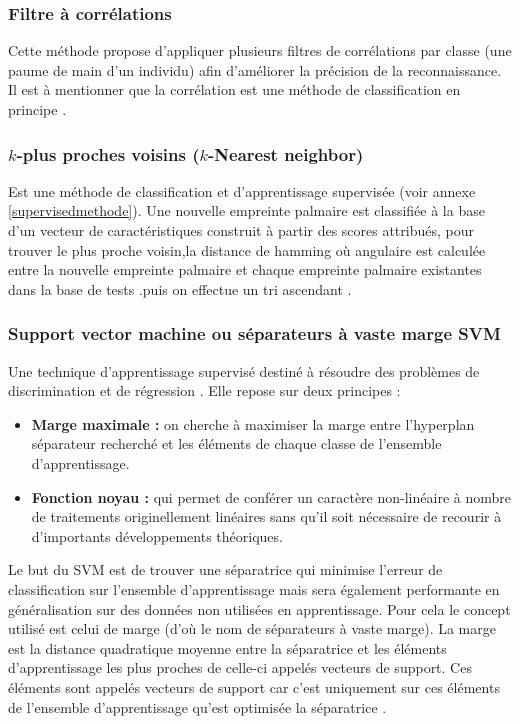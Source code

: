 \subsubsection{Filtre à corrélations }
Cette méthode propose d’appliquer plusieurs filtres de corrélations par classe (une paume de main d’un individu) afin d’améliorer la précision de la reconnaissance. Il est à mentionner que la corrélation est une méthode de classification en principe \cite{zhang2012comparative}.
\subsubsection{$ k $-plus proches voisins ($ k $-Nearest neighbor)}
Est une méthode de classification et d’apprentissage supervisée (voir annexe \ref{supervisedmethode}). Une nouvelle empreinte palmaire est classifiée à la base d’un vecteur de caractéristiques construit à partir des scores attribués, pour trouver le plus proche voisin,la distance de hamming où angulaire est calculée entre la nouvelle empreinte palmaire et chaque empreinte palmaire existantes dans la base de tests .puis on effectue un tri ascendant \citep{kong2009survey}.
\subsubsection{Support vector machine ou séparateurs à vaste marge  SVM  }
 Une technique d’apprentissage supervisé destiné à résoudre des problèmes de discrimination et de régression \citep{honeine2007methodes}. Elle repose sur deux principes :
 \begin{itemize}
 	\item  \textbf{ Marge maximale : }on cherche à maximiser la marge entre l’hyperplan séparateur recherché et les éléments de chaque classe de l’ensemble d’apprentissage.
 	\item  \textbf{Fonction noyau :} qui permet de conférer un caractère non-linéaire à nombre de traitements originellement linéaires sans qu’il soit nécessaire de recourir à d’importants développements théoriques.
 \end{itemize}
 
 Le but du  SVM  est de trouver une séparatrice qui minimise l'erreur de classification sur l'ensemble d'apprentissage mais sera également performante en généralisation sur des données non utilisées en apprentissage. Pour cela le concept utilisé est celui de marge (d'où le nom de séparateurs à vaste marge). La marge est la distance quadratique moyenne entre la séparatrice et les éléments d'apprentissage les plus proches de celle-ci appelés vecteurs de support. Ces éléments sont appelés vecteurs de support car c'est uniquement sur ces éléments de l'ensemble d'apprentissage qu'est optimisée la séparatrice \citep{belahcene2012comparaison}.

